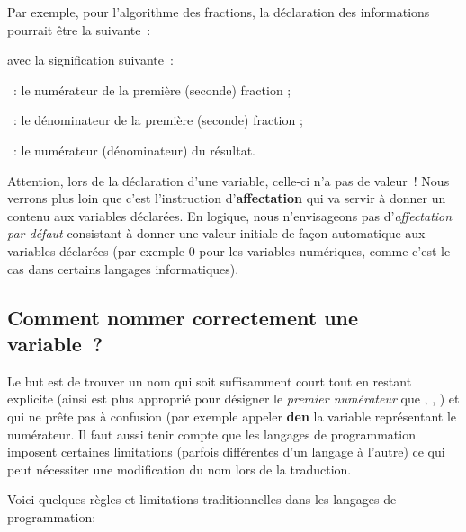 			Par exemple, pour l’algorithme des fractions, la déclaration des
			informations pourrait être la suivante~:


			avec la signification suivante~:

			\begin{liste}
			\item
				~: le numérateur 
				de la première (seconde) fraction ;
			\item
				~: le dénominateur 
				de la première (seconde) fraction ;
			\item
				~:
				le numérateur (dénominateur) du résultat.
			\end{liste}
			
			Attention, lors de la déclaration d’une variable, celle-ci n’a pas de
			valeur~! Nous verrons plus loin que c’est l’instruction
			d’\textbf{affectation} qui va servir à donner un contenu aux variables
			déclarées. En logique, nous n’envisageons pas d’\textit{affectation par
			défaut} consistant à donner une valeur initiale de façon automatique
			aux variables déclarées (par exemple 0 pour les variables numériques,
			comme c’est le cas dans certains langages informatiques).

		\subsection{Comment nommer correctement une variable~?}

			Le but est de trouver un nom qui soit suffisamment court tout en restant
			explicite (ainsi  est plus approprié pour
			désigner le \textit{premier numérateur }que ,
			, ) et qui ne prête pas à confusion (par exemple
			appeler \textbf{den} la variable représentant le numérateur.
			Il faut aussi tenir compte que les
			langages de programmation imposent certaines limitations (parfois
			différentes d’un langage à l’autre)
			ce qui peut nécessiter une modification du nom lors de la traduction.

			Voici quelques règles et limitations traditionnelles dans les langages
			de programmation:

